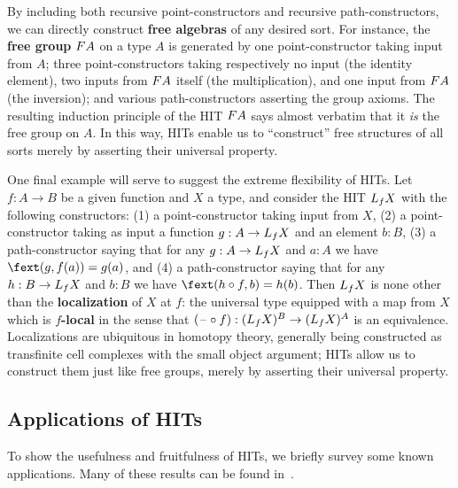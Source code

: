 \documentclass{amsart}
\begin{document}
By including both recursive point-constructors and recursive path-constructors, we can directly construct \textbf{free algebras} of any desired sort.
For instance, the \textbf{free group} $F A$ on a type $A$
is generated by one point-constructor taking input from $A$; three point-constructors taking respectively no input (the identity element), two inputs from $F A$ itself (the multiplication), and one input from $F A$ (the inversion); and various path-constructors asserting the group axioms.
The resulting induction principle of the HIT $F A$ says almost verbatim that it \emph{is} the free group on $A$.
In this way, HITs enable us to ``construct'' free structures of all sorts merely by asserting their universal property.

One final example will serve to suggest the extreme flexibility of HITs.
Let $f:A\to B$ be a given function and $X$ a type, and consider the HIT $L_{f} X$ with the following constructors: (1) a point-constructor taking input from $X$, (2) a point-constructor \fext taking as input a function $g:A\to L_{f} X$ and an element $b:B$, (3) a path-constructor saying that for any $g:A\to L_{f} X$ and $a:A$ we have $\fext(g,f(a))=g(a)$, and (4) a path-constructor saying that for any $h:B\to L_{f} X$ and $b:B$ we have $\fext(h\circ f,b)=h(b)$.
Then $L_{f} X$ is none other than the \textbf{localization} of $X$ at $f$: the universal type equipped with a map from $X$ which is \textbf{$f$-local} in the sense that $(\mathord{\hspace{1pt}\text{--}\hspace{1pt}}\circ f):(L_{f} X)^B \to (L_{f} X)^A$ is an equivalence.
Localizations are ubiquitous in homotopy theory, generally being constructed as transfinite cell complexes with the small object argument; HITs allow us to construct them just like free groups, merely by asserting their universal property.


\subsection{Applications of HITs}
\label{sec:hit-apps}

To show the usefulness and fruitfulness of HITs, we briefly survey some known applications.
Many of these results can be found in~\cite{hottbook}.
\end{document}
